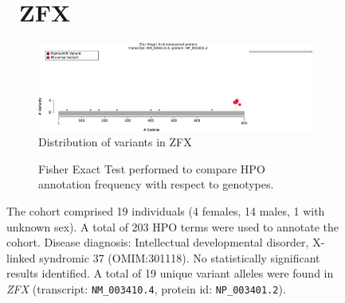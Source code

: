 \begin{figure}[htbp]
\section*{ ZFX}
\centering
\begin{subfigure}[b]{0.95\textwidth}
\centering
\includegraphics[width=\textwidth]{ img/ZFX_protein_diagram.pdf} 
\captionsetup{justification=raggedright,singlelinecheck=false}
\caption{Distribution of variants in ZFX}
\end{subfigure}

\vspace{2em}

\begin{subfigure}[b]{0.95\textwidth}
\centering
{}
\captionsetup{justification=raggedright,singlelinecheck=false}
\caption{Fisher Exact Test performed to compare HPO annotation frequency with respect to genotypes.}
\end{subfigure}

\vspace{2em}

\caption{The cohort comprised 19 individuals (4 females, 14 males, 1 with unknown sex). A total of 203 HPO terms were used to annotate the cohort. Disease diagnosis: Intellectual developmental disorder, X-linked syndromic 37 (OMIM:301118). No statistically significant results identified. A total of 19 unique variant alleles were found in \textit{ZFX} (transcript: \texttt{NM\_003410.4}, protein id: \texttt{NP\_003401.2}).}
\end{figure}
